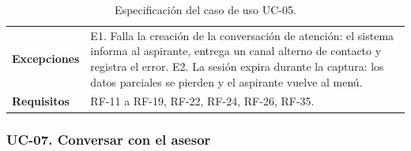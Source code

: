 \documentclass[12pt,a4paper]{report}
\begin{document}
\begin{table}[H]
\begin{tabularx}{\textwidth}{p{3.2cm}X}
        \textbf{Excepciones} &
        E1. Falla la creación de la conversación de atención: el sistema informa al aspirante, entrega un canal alterno de contacto y registra el error. \newline
        E2. La sesión expira durante la captura: los datos parciales se pierden y el aspirante vuelve al menú. \\
        \textbf{Requisitos} & RF-11 a RF-19, RF-22, RF-24, RF-26, RF-35. \\
        \bottomrule
    \end{tabularx}
    \caption{Especificación del caso de uso UC-05.}
\end{table}

\subsubsection{UC-07. Conversar con el asesor}
\end{document}
